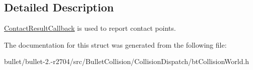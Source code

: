 \subsection{Detailed Description}
\hyperlink{structbt_collision_world_1_1_contact_result_callback}{Contact\+Result\+Callback} is used to report contact points. 

The documentation for this struct was generated from the following file\+:\begin{DoxyCompactItemize}
\item 
bullet/bullet-\/2.-\/r2704/src/\+Bullet\+Collision/\+Collision\+Dispatch/bt\+Collision\+World.\+h\end{DoxyCompactItemize}

